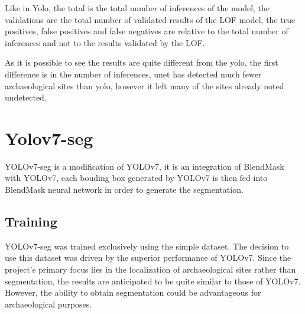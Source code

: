 Like in Yolo, the total is the total number of inferences of the model, the validations are the total number of validated results of the LOF model, the true positives, false positives and false negatives are relative to the total number of inferences and not to the results validated by the LOF.

As it is possible to see the results are quite different from the yolo, the first difference is in the number of inferences, unet has detected much fewer archaeological sites than yolo, however it left many of the sites already noted undetected.


\section{Yolov7-seg}
YOLOv7-seg is a modification of YOLOv7, it is an integration of BlendMask with YOLOv7, each bouding box generated by YOLOv7 is then fed into BlendMask neural network in order to generate the segmentation.

\subsection{Training}

YOLOv7-seg was trained exclusively using the simple dataset. The decision to use this dataset was driven by the superior performance of YOLOv7. Since the project's primary focus lies in the localization of archaeological sites rather than segmentation, the results are anticipated to be quite similar to those of YOLOv7. However, the ability to obtain segmentation could be advantageous for archaeological purposes.


